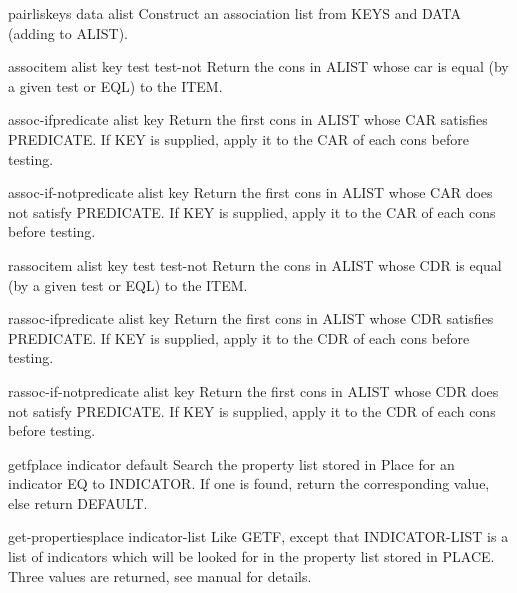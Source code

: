 \documentclass[10pt,english]{book}
\begin{document}
\begin{function}{pairlis}{keys data \op alist}
  Construct an association list from KEYS and DATA (adding to ALIST).
\end{function}

\begin{function}{assoc}{item alist \key key test test-not}
  Return the cons in ALIST whose car is equal (by a given test or EQL) to
   the ITEM.
\end{function}

\begin{function}{assoc-if}{predicate alist \key key}
  Return the first cons in ALIST whose CAR satisfies PREDICATE. If
   KEY is supplied, apply it to the CAR of each cons before testing.
\end{function}

\begin{function}{assoc-if-not}{predicate alist \key key}
  Return the first cons in ALIST whose CAR does not satisfy PREDICATE.
  If KEY is supplied, apply it to the CAR of each cons before testing.
\end{function}

\begin{function}{rassoc}{item alist \key key test test-not}
  Return the cons in ALIST whose CDR is equal (by a given test or EQL) to
   the ITEM.
\end{function}

\begin{function}{rassoc-if}{predicate alist \key key}
  Return the first cons in ALIST whose CDR satisfies PREDICATE. If KEY
  is supplied, apply it to the CDR of each cons before testing.
\end{function}

\begin{function}{rassoc-if-not}{predicate alist \key key}
  Return the first cons in ALIST whose CDR does not satisfy PREDICATE.
  If KEY is supplied, apply it to the CDR of each cons before testing.
\end{function}

\begin{accessor}{getf}{place indicator \op default}
  Search the property list stored in Place for an indicator EQ to INDICATOR.
  If one is found, return the corresponding value, else return DEFAULT.
\end{accessor}

\begin{function}{get-properties}{place indicator-list}
  Like GETF, except that INDICATOR-LIST is a list of indicators which will
  be looked for in the property list stored in PLACE. Three values are
  returned, see manual for details.
\end{function}
\end{document}
